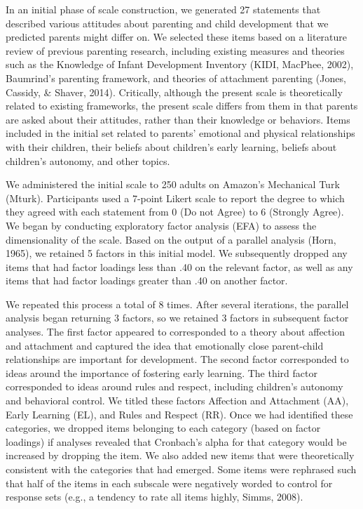 \documentclass[floatsintext,man]{apa6}
\theoremstyle{definition}
\theoremstyle{definition}
\theoremstyle{definition}
\theoremstyle{remark}
\begin{document}
In an initial phase of scale construction, we generated 27 statements
that described various attitudes about parenting and child development
that we predicted parents might differ on. We selected these items based
on a literature review of previous parenting research, including
existing measures and theories such as the Knowledge of Infant
Development Inventory (KIDI, MacPhee, 2002), Baumrind's parenting
framework, and theories of attachment parenting (Jones, Cassidy, \&
Shaver, 2014). Critically, although the present scale is theoretically
related to existing frameworks, the present scale differs from them in
that parents are asked about their attitudes, rather than their
knowledge or behaviors. Items included in the initial set related to
parents' emotional and physical relationships with their children, their
beliefs about children's early learning, beliefs about children's
autonomy, and other topics.

We administered the initial scale to 250 adults on Amazon's Mechanical
Turk (Mturk). Participants used a 7-point Likert scale to report the
degree to which they agreed with each statement from 0 (Do not Agree) to
6 (Strongly Agree). We began by conducting exploratory factor analysis
(EFA) to assess the dimensionality of the scale. Based on the output of
a parallel analysis (Horn, 1965), we retained 5 factors in this initial
model. We subsequently dropped any items that had factor loadings less
than .40 on the relevant factor, as well as any items that had factor
loadings greater than .40 on another factor.

We repeated this process a total of 8 times. After several iterations,
the parallel analysis began returning 3 factors, so we retained 3
factors in subsequent factor analyses. The first factor appeared to
corresponded to a theory about affection and attachment and captured the
idea that emotionally close parent-child relationships are important for
development. The second factor corresponded to ideas around the
importance of fostering early learning. The third factor corresponded to
ideas around rules and respect, including children's autonomy and
behavioral control. We titled these factors Affection and Attachment
(AA), Early Learning (EL), and Rules and Respect (RR). Once we had
identified these categories, we dropped items belonging to each category
(based on factor loadings) if analyses revealed that Cronbach's alpha
for that category would be increased by dropping the item. We also added
new items that were theoretically consistent with the categories that
had emerged. Some items were rephrased such that half of the items in
each subscale were negatively worded to control for response sets (e.g.,
a tendency to rate all items highly, Simms, 2008).
\end{document}
